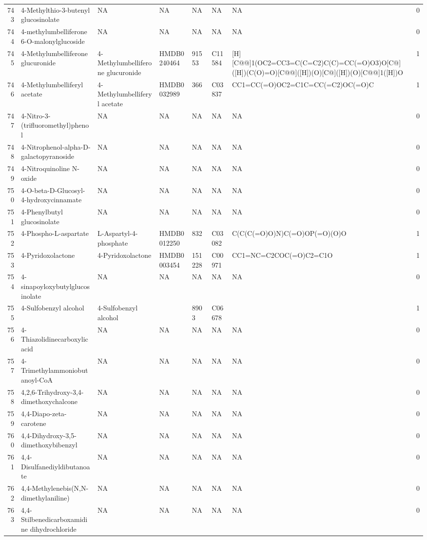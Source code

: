 \documentclass[a4paper]{article}
\begin{document}
\begin{longtable}{rlllllll}
  743 & 4-Methylthio-3-butenyl glucosinolate & NA & NA & NA & NA & NA & 0 \\ 
  744 & 4-methylumbelliferone 6-O-malonylglucoside & NA & NA & NA & NA & NA & 0 \\ 
  745 & 4-Methylumbelliferone glucuronide & 4-Methylumbelliferone glucuronide & HMDB0240464 & 91553 & C11584 & [H][C@@]1(OC2=CC3=C(C=C2)C(C)=CC(=O)O3)O[C@]([H])(C(O)=O)[C@@]([H])(O)[C@]([H])(O)[C@@]1([H])O & 1 \\ 
  746 & 4-Methylumbelliferyl acetate & 4-Methylumbelliferyl acetate & HMDB0032989 & 366 & C03837 & CC1=CC(=O)OC2=C1C=CC(=C2)OC(=O)C & 1 \\ 
  747 & 4-Nitro-3-(trifluoromethyl)phenol & NA & NA & NA & NA & NA & 0 \\ 
  748 & 4-Nitrophenol-alpha-D-galactopyranoside & NA & NA & NA & NA & NA & 0 \\ 
  749 & 4-Nitroquinoline N-oxide & NA & NA & NA & NA & NA & 0 \\ 
  750 & 4-O-beta-D-Glucosyl-4-hydroxycinnamate & NA & NA & NA & NA & NA & 0 \\ 
  751 & 4-Phenylbutyl glucosinolate & NA & NA & NA & NA & NA & 0 \\ 
  752 & 4-Phospho-L-aspartate & L-Aspartyl-4-phosphate & HMDB0012250 & 832 & C03082 & C(C(C(=O)O)N)C(=O)OP(=O)(O)O & 1 \\ 
  753 & 4-Pyridoxolactone & 4-Pyridoxolactone & HMDB0003454 & 151228 & C00971 & CC1=NC=C2COC(=O)C2=C1O & 1 \\ 
  754 & 4-sinapoyloxybutylglucosinolate & NA & NA & NA & NA & NA & 0 \\ 
  755 & 4-Sulfobenzyl alcohol & 4-Sulfobenzyl alcohol &  & 8903 & C06678 &  & 1 \\ 
  756 & 4-Thiazolidinecarboxylic acid & NA & NA & NA & NA & NA & 0 \\ 
  757 & 4-Trimethylammoniobutanoyl-CoA & NA & NA & NA & NA & NA & 0 \\ 
  758 & 4,2,6-Trihydroxy-3,4-dimethoxychalcone & NA & NA & NA & NA & NA & 0 \\ 
  759 & 4,4-Diapo-zeta-carotene & NA & NA & NA & NA & NA & 0 \\ 
  760 & 4,4-Dihydroxy-3,5-dimethoxybibenzyl & NA & NA & NA & NA & NA & 0 \\ 
  761 & 4,4-Disulfanediyldibutanoate & NA & NA & NA & NA & NA & 0 \\ 
  762 & 4,4-Methylenebis(N,N-dimethylaniline) & NA & NA & NA & NA & NA & 0 \\ 
  763 & 4,4-Stilbenedicarboxamidine dihydrochloride & NA & NA & NA & NA & NA & 0 \\ 

\end{longtable}
\end{document}
